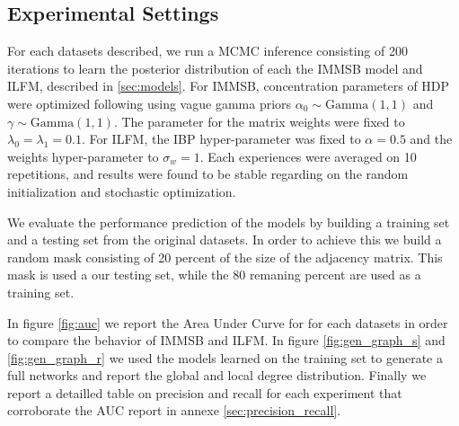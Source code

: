\subsection{Experimental Settings}
For each datasets described,  we run a MCMC inference consisting of 200 iterations to learn the posterior distribution of each the IMMSB model and ILFM, described in \ref{sec:models}. For IMMSB, concentration parameters of HDP were optimized following \cite{HDP} using vague gamma priors $\alpha_0 \sim \text{Gamma}(1,1)$ and       $\gamma \sim \text{Gamma}(1,1)$. The parameter for the matrix weights were fixed to $\lambda_0=\lambda_1=0.1$. For ILFM, the IBP hyper-parameter was fixed to   $\alpha=0.5$ and the weights hyper-parameter to $\sigma_w = 1$. Each experiences were averaged on 10 repetitions, and results were found to be stable regarding on the random  initialization and stochastic optimization.


We evaluate the performance prediction of the models by building a training set and a testing set from the original datasets. In order to achieve this we build a random mask consisting of 20 percent of the size of the adjacency matrix. This mask is used a our testing set, while the 80 remaning percent are used as a training set.

In figure \ref{fig:auc} we report the Area Under Curve for for each datasets in order to compare the behavior of IMMSB and ILFM. In figure \ref{fig:gen_graph_s} and \ref{fig:gen_graph_r} we used the models learned on the training set to generate a full networks and report the global and local degree distribution. Finally we report a detailled table on precision and recall for each experiment that corroborate the AUC report in annexe \ref{sec:precision_recall}.

